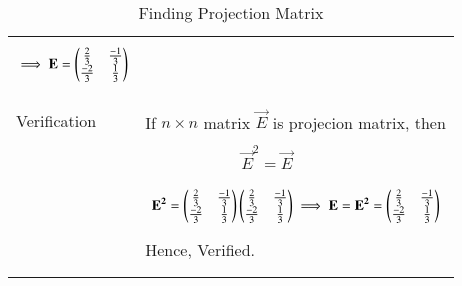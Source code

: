 \documentclass[journal,12pt]{IEEEtran}
\begin{document}
\begin{longtable}{|p{4cm}|p{14cm}|}
{\begin{align}
      \implies{ \mathbf{E}= \ensuremath{\begin{pmatrix}\frac{2}{3}&\frac{-1}{3}\\\frac{-2}{3}& \frac{1}{3}\end{pmatrix}}}
      \end{align}}\\
      &\\
\hline
\multirow{3}{*}{Verification} & \\
& If $n\times n$ matrix $\vec{E}$ is projecion matrix, then\\
	&\\
	&$\qquad\qquad\qquad \vec{E}^2=\vec{E}$\\
	&\\
  &{\begin{align}
  \mathbf{E^{2}} = \begin{pmatrix}\frac{2}{3}&\frac{-1}{3}\\\frac{-2}{3}& \frac{1}{3}\end{pmatrix}\begin{pmatrix}\frac{2}{3}&\frac{-1}{3}\\\frac{-2}{3}& \frac{1}{3}\end{pmatrix}
  \implies \mathbf{E}=\mathbf{E^{2}}=\begin{pmatrix}\frac{2}{3}&\frac{-1}{3}\\\frac{-2}{3}& \frac{1}{3}\end{pmatrix}
  \end{align}}\\
  & Hence, Verified.\\
  &\\
	\hline
\caption{Finding Projection Matrix}
\label{table:1}
\end{longtable}
\end{document}
